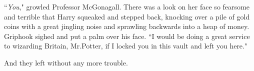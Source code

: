 ``\emph{You}," growled Professor McGonagall. There was a look on her face so fearsome and terrible that Harry squeaked and stepped back, knocking over a pile of gold coins with a great jingling noise and sprawling backwards into a heap of money. Griphook sighed and put a palm over his face. ``I would be doing a great service to wizarding Britain, Mr.\?Potter, if I locked you in this vault and left you here."

And they left without any more trouble.

